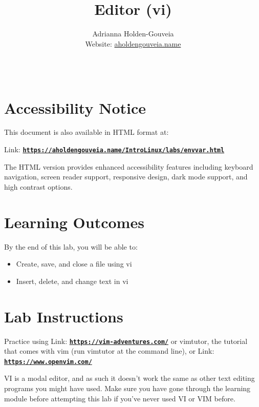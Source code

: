 \documentclass[12pt]{article}
\title{Editor (vi)}
\author{
        Adrianna Holden-Gouveia \\
        Website: \href{https://aholdengouveia.name}{aholdengouveia.name}\\ 
        \date{\vspace{-5ex}}
        \faGithub {: aholdengouveia} \\
        }
\begin{document}
    

\maketitle

\section*{Accessibility Notice}
This document is also available in HTML format at:

Link: \href{https://aholdengouveia.name/IntroLinux/labs/envvar.html}{\textbf{\nolinkurl{https://aholdengouveia.name/IntroLinux/labs/envvar.html}}}

The HTML version provides enhanced accessibility features including keyboard navigation, screen reader support, responsive design, dark mode support, and high contrast options.



\section*{Learning Outcomes}
By the end of this lab, you will be able to:
\begin{itemize}
    \item Create, save, and close a file using vi
    \item Insert, delete, and change text in vi
\end{itemize}


\section*{Lab Instructions}


Practice using Link: \href{https://vim-adventures.com/}{\textbf{\nolinkurl{https://vim-adventures.com/}}} or vimtutor, the tutorial that comes with vim (run vimtutor at the command line),  or Link: \href{https://www.openvim.com/}{\textbf{\nolinkurl{https://www.openvim.com/}}}

VI is a modal editor, and as such it doesn't work the same as other text editing programs you might have used. Make sure you have gone through the learning module before attempting this lab if you've never used VI or VIM before. 
\end{document}
